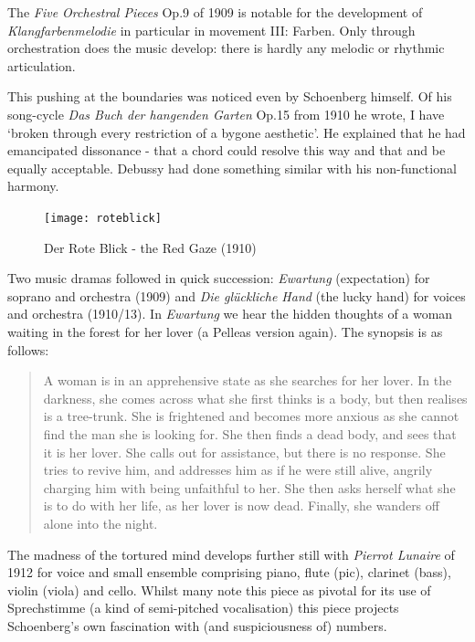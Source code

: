 The \textit{Five Orchestral Pieces} Op.9 of 1909 is notable for the development of \textit{Klangfarbenmelodie} in particular in movement III: Farben. Only through orchestration does the music develop: there is hardly any melodic or rhythmic articulation. 

This pushing at the boundaries was noticed even by Schoenberg himself. Of his song-cycle \textit{Das Buch der hangenden Garten} Op.15 from 1910 he wrote, I have `broken through every restriction of a bygone aesthetic'. He explained that he had emancipated dissonance - that a chord could resolve this way and that and be equally acceptable. Debussy had done something similar with his non-functional harmony. 

\begin{figure}[H]
\centering
\texttt{[image: roteblick]}\caption{Der Rote Blick - the Red Gaze (1910)}
\label{fig:roteblick}
\end{figure}

Two music dramas followed in quick succession: \textit{Ewartung} (expectation) for soprano and orchestra (1909) and \textit{Die gl\"uckliche Hand} (the lucky hand) for voices and orchestra (1910/13). In \textit{Ewartung} we hear the hidden thoughts of a woman waiting in the forest for her lover (a Pelleas version again). The synopsis is as follows:

\begin{quotation} 
A woman is in an apprehensive state as she searches for her lover. In the darkness, she comes across what she first thinks is a body, but then realises is a tree-trunk. She is frightened and becomes more anxious as she cannot find the man she is looking for. She then finds a dead body, and sees that it is her lover. She calls out for assistance, but there is no response. She tries to revive him, and addresses him as if he were still alive, angrily charging him with being unfaithful to her. She then asks herself what she is to do with her life, as her lover is now dead. Finally, she wanders off alone into the night.
\end{quotation}

The madness of the tortured mind develops further still with \textit{Pierrot Lunaire} of 1912 for voice and small ensemble comprising piano, flute (pic), clarinet (bass), violin (viola) and cello. Whilst many note this piece as pivotal for its use of Sprechstimme (a kind of semi-pitched vocalisation) this piece projects Schoenberg's own fascination with (and suspiciousness of) numbers. 

